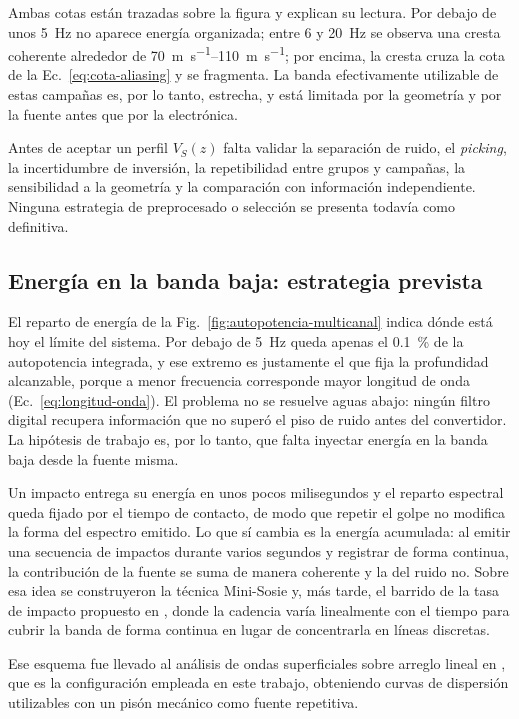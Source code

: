 Ambas cotas están trazadas sobre la figura y explican su lectura. Por debajo de unos
\SI{5}{\hertz} no aparece energía organizada; entre \SI{6}{} y \SI{20}{\hertz} se observa
una cresta coherente alrededor de \SIrange{70}{110}{\meter\per\second}; por encima, la
cresta cruza la cota de la Ec.~\eqref{eq:cota-aliasing} y se fragmenta. La banda
efectivamente utilizable de estas campañas es, por lo tanto, estrecha, y está limitada
por la geometría y por la fuente antes que por la electrónica.

Antes de aceptar un perfil $V_S(z)$ falta validar la separación de ruido, el
\emph{picking}, la incertidumbre de inversión, la repetibilidad entre grupos y campañas,
la sensibilidad a la geometría y la comparación con información independiente. Ninguna
estrategia de preprocesado o selección se presenta todavía como definitiva.

\subsection{Energía en la banda baja: estrategia prevista}

El reparto de energía de la Fig.~\ref{fig:autopotencia-multicanal} indica dónde está hoy
el límite del sistema. Por debajo de \SI{5}{\hertz} queda apenas el \SI{0.1}{\percent} de
la autopotencia integrada, y ese extremo es justamente el que fija la profundidad
alcanzable, porque a menor frecuencia corresponde mayor longitud de onda
(Ec.~\ref{eq:longitud-onda}). El problema no se resuelve aguas abajo: ningún filtro
digital recupera información que no superó el piso de ruido antes del convertidor. La
hipótesis de trabajo es, por lo tanto, que falta inyectar energía en la banda baja desde
la fuente misma.

Un impacto entrega su energía en unos pocos milisegundos y el reparto espectral queda
fijado por el tiempo de contacto, de modo que repetir el golpe no modifica la forma del
espectro emitido. Lo que sí cambia es la energía acumulada: al emitir una secuencia de
impactos durante varios segundos y registrar de forma continua, la contribución de la
fuente se suma de manera coherente y la del ruido no. Sobre esa idea se construyeron la
técnica Mini-Sosie y, más tarde, el barrido de la tasa de impacto propuesto en
\cite{Park1996SIST}, donde la cadencia varía linealmente con el tiempo para cubrir la
banda de forma continua en lugar de concentrarla en líneas discretas.

Ese esquema fue llevado al análisis de ondas superficiales sobre arreglo lineal
en \cite{Guan2022}, que es la configuración empleada en este trabajo, obteniendo curvas
de dispersión utilizables con un pisón mecánico como fuente repetitiva.

